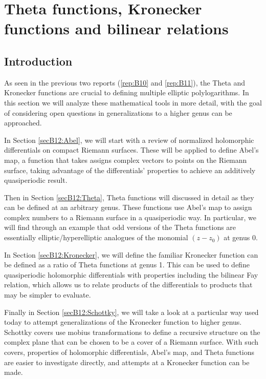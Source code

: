 

\newcommand{\bolde}[0]{\mathbf{e}}

\chapter{Theta functions, Kronecker functions and bilinear relations}
\label{rep:B12}

\section{Introduction}

As seen in the previous two reports (\ref{rep:B10} and \ref{rep:B11}), the Theta and Kronecker functions are crucial to defining multiple elliptic polylogarithms. In this section we will analyze these mathematical tools in more detail, with the goal of considering open questions in generalizations to a higher genus can be approached.

In Section \ref{secB12:Abel}, we will start with a review of normalized holomorphic differentials on compact Riemann surfaces. These will be applied to define Abel's map, a function that takes assigns complex vectors to points on the Riemann surface, taking advantage of the differentials' properties to achieve an additively quasiperiodic result.

Then in Section \ref{secB12:Theta}, Theta functions will discussed in detail as they can be defined at an arbitrary genus. These functions use Abel's map to assign complex numbers to a Riemann surface in a quasiperiodic way. In particular, we will find through an example that odd versions of the Theta functions are essentially elliptic/hyperelliptic analogues of the monomial $(z-z_0)$ at genus 0.

In Section \ref{secB12:Kronecker}, we will define the familiar Kronecker function can be defined as a ratio of Theta functions at genus 1. This can be used to define quasiperiodic holomorphic differentials with properties including the bilinear Fay relation, which allows us to relate products of the differentials to products that may be simpler to evaluate.

Finally in Section \ref{secB12:Schottky}, we will take a look at a particular way used today to attempt generalizations of the Kronecker function to higher genus. Schottky covers use mobius transformations to define a recursive structure on the complex plane that can be chosen to be a cover of a Riemann surface. With such covers, properties of holomorphic differentials, Abel's map, and Theta functions are easier to investigate directly, and attempts at a Kronecker function can be made.


